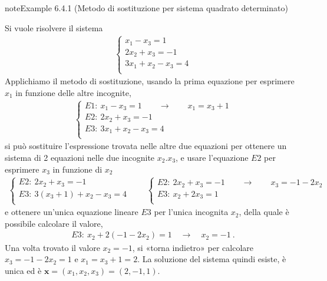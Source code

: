 \documentclass[letterpaper,10pt,italian]{jupyterBook}
\begin{document}
\begin{sphinxadmonition}{note}{Example 6.4.1 (Metodo di sostituzione per sistema quadrato determinato)}



\sphinxAtStartPar
Si vuole risolvere il sistema
\begin{equation*}
\begin{split}\begin{cases}
      x_1             - x_3 = 1 \\
                2 x_2 + x_3 =-1 \\
    3 x_1   +     x_2 - x_3 = 4 \\
\end{cases}\end{split}
\end{equation*}
\sphinxAtStartPar
Applichiamo il metodo di sostituzione, usando la prima equazione per esprimere \(x_1\) in funzione delle altre incognite,
\begin{equation*}
\begin{split}\begin{cases}
  E1: \   x_1             - x_3 = 1  \qquad \rightarrow \qquad x_1 = x_3 + 1 \\
  E2: \             2 x_2 + x_3 =-1 \\
  E3: \ 3 x_1   +     x_2 - x_3 = 4 \\
\end{cases}\end{split}
\end{equation*}
\sphinxAtStartPar
si può sostituire l’espressione trovata nelle altre due equazioni per ottenere un sistema di 2 equazioni nelle due incognite \(x_2. x_3\), e usare l’equazione \(E2\) per esprimere \(x_3\) in funzione di \(x_2\)
\begin{equation*}
\begin{split}
\begin{cases}
  E2: \             2 x_2 + x_3 =-1 \\
  E3: \ 3 (x_3 + 1) + x_2 - x_3 = 4 \\
\end{cases}
\qquad
\begin{cases}
  E2: \ 2 x_2 +   x_3 =-1 \qquad \rightarrow \qquad x_3 = -1 - 2 x_2 \\
  E3: \   x_2 + 2 x_3 = 1 \\
\end{cases}
\end{split}
\end{equation*}
\sphinxAtStartPar
e ottenere un’unica equazione lineare \(E3\) per l’unica incognita \(x_2\), della quale è possibile calcolare il valore,
\begin{equation*}
\begin{split}
E3: \ x_2 + 2 ( -1 - 2 x_2 ) = 1 \quad \rightarrow \quad x_2 = -1 \ .
\end{split}
\end{equation*}
\sphinxAtStartPar
Una volta trovato il valore \(x_2 = -1\), si «torna indietro» per calcolare \(x_3 = - 1 - 2 x_2 = 1\) e \(x_1 = x_3 + 1 = 2\). La soluzione del sistema quindi esiste, è unica ed è \(\mathbf{x} = (x_1, x_2, x_3) = (2, -1, 1)\).
\end{sphinxadmonition}
\end{document}
